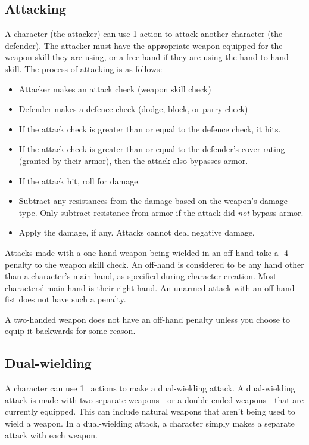 \begin{multicols*}{2}
    \section{Attacking}\label{combat:attacking}
    A character (the attacker) can use 1 action to attack another character
    (the defender). The attacker must have the appropriate weapon equipped
    for the weapon skill they are using, or a free hand if they are using
    the hand-to-hand skill. The process of attacking is as follows:
    \begin{itemize}
        \item Attacker makes an attack check (weapon skill check)
        \item Defender makes a defence check (dodge, block, or parry check)
        \item If the attack check is greater than or equal to the defence
            check, it hits.
        \item If the attack check is greater than or equal to the defender's
            cover rating (granted by their armor), then
            the attack also bypasses armor.
        \item If the attack hit, roll for damage.
        \item Subtract any resistances from the damage based
            on the weapon's damage type. Only subtract resistance from armor
            if the attack did \textit{not} bypass armor.
        \item Apply the damage, if any. Attacks cannot deal negative
            damage.
    \end{itemize}

    Attacks made with a one-hand weapon being wielded in an off-hand take a -4
    penalty to the weapon skill check. An off-hand is considered to be any hand
    other than a character's main-hand, as specified during character creation.
    Most characters' main-hand is their right hand. An unarmed attack with an
    off-hand fist does not have such a penalty.

    A two-handed weapon does not have an off-hand penalty unless you choose to
    equip it backwards for some reason.

    \subsection{Dual-wielding}\label{combat:dual-wielding}
    A character can use 1 \textonehalf\ actions to make a dual-wielding
    attack. A dual-wielding attack is made with two separate weapons - or a
    double-ended weapons - that are currently equipped. This can include
    natural weapons that aren't being used to wield a weapon. In a
    dual-wielding attack, a character simply makes a separate attack with each
    weapon.


\end{multicols*}
